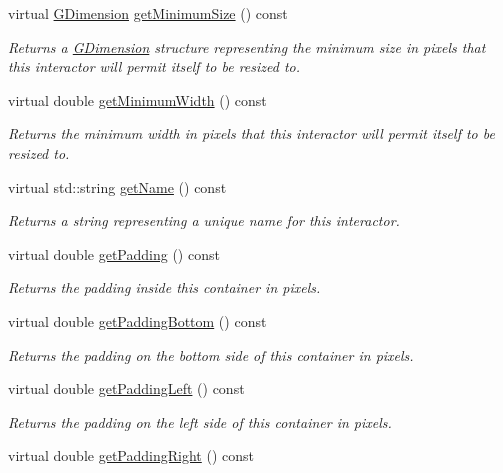 \begin{DoxyCompactItemize}
virtual \mbox{\hyperlink{classGDimension}{G\+Dimension}} \mbox{\hyperlink{classGInteractor_a66b5af0b32493b4d597ca0a3df2049ea}{get\+Minimum\+Size}} () const
\begin{DoxyCompactList}\small\item\em Returns a \mbox{\hyperlink{classGDimension}{G\+Dimension}} structure representing the minimum size in pixels that this interactor will permit itself to be resized to. \end{DoxyCompactList}\item 
virtual double \mbox{\hyperlink{classGInteractor_a59e668114fe3d49d2a0f28deb258f7c8}{get\+Minimum\+Width}} () const
\begin{DoxyCompactList}\small\item\em Returns the minimum width in pixels that this interactor will permit itself to be resized to. \end{DoxyCompactList}\item 
virtual std\+::string \mbox{\hyperlink{classGInteractor_a8a60438a5b55d0b2ceb35c8674b9d8c5}{get\+Name}} () const
\begin{DoxyCompactList}\small\item\em Returns a string representing a unique name for this interactor. \end{DoxyCompactList}\item 
virtual double \mbox{\hyperlink{classGContainer_a19fdf4f4500aead343992102066983cb}{get\+Padding}} () const
\begin{DoxyCompactList}\small\item\em Returns the padding inside this container in pixels. \end{DoxyCompactList}\item 
virtual double \mbox{\hyperlink{classGContainer_a5696e2debbbafb717c0d47e069b896e4}{get\+Padding\+Bottom}} () const
\begin{DoxyCompactList}\small\item\em Returns the padding on the bottom side of this container in pixels. \end{DoxyCompactList}\item 
virtual double \mbox{\hyperlink{classGContainer_af28748a6467a4d3337788578522fa8f4}{get\+Padding\+Left}} () const
\begin{DoxyCompactList}\small\item\em Returns the padding on the left side of this container in pixels. \end{DoxyCompactList}\item 
virtual double \mbox{\hyperlink{classGContainer_a8d75cea586f7cd6611432122a080ecce}{get\+Padding\+Right}} () const

\end{DoxyCompactItemize}
